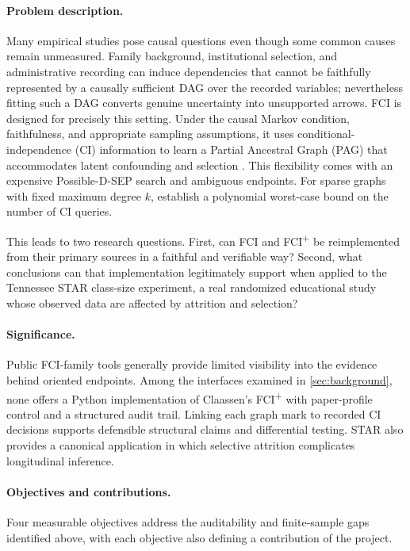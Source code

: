 \documentclass[11pt,a4paper]{article}
\theoremstyle{definition}
\newcommand{\FCIplus}{FCI\textsuperscript{+}}
\begin{document}
\paragraph{Problem description.}
Many empirical studies pose causal questions even though some common causes
remain unmeasured. Family background, institutional selection, and
administrative recording can induce dependencies that cannot be faithfully
represented by a causally sufficient DAG over the recorded variables;
nevertheless fitting such a DAG converts genuine uncertainty into
unsupported arrows. FCI is designed for precisely this setting. Under the
causal Markov condition, faithfulness, and appropriate sampling assumptions,
it uses conditional-independence (CI) information to learn a Partial
Ancestral Graph (PAG) that accommodates latent confounding and selection
\citep{spirtes2000causation,richardson2002ancestral,glymour2019review}.
This flexibility comes with an expensive Possible-D-SEP search and ambiguous
endpoints. For sparse graphs with fixed maximum degree \(k\),
\citet{claassen2013learning} establish a polynomial worst-case bound on the
number of CI queries.

This leads to two research questions. First, can FCI and \FCIplus{} be
reimplemented from their primary sources in a faithful and verifiable way?
Second, what conclusions can that implementation legitimately support when
applied to the Tennessee STAR class-size experiment, a real randomized
educational study whose observed data are affected by attrition and
selection?

\paragraph{Significance.}
Public FCI-family tools generally provide limited visibility into the
evidence behind oriented endpoints. Among the interfaces examined in
\cref{sec:background}, none offers a Python implementation of Claassen's
\FCIplus{} with paper-profile control and a structured audit trail. Linking
each graph mark to recorded CI decisions supports defensible structural
claims and differential testing. STAR also provides a canonical application
in which selective attrition complicates longitudinal inference.

\paragraph{Objectives and contributions.}
Four measurable objectives address the auditability and finite-sample gaps
identified above, with each objective also defining a contribution of the
project.
\end{document}

